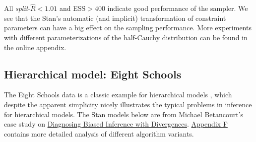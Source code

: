 \documentclass[american,]{article}
\begin{document}


All \emph{split}-\(\widehat{R}<1.01\) and ESS\(>400\) indicate good
performance of the sampler. We see that the Stan's automatic (and
implicit) transformation of constraint parameters can have a big effect
on the sampling performance. More experiments with different
parameterizations of the half-Cauchy distribution can be found in
the online appendix.

\hypertarget{eightschools}{%
\subsection{Hierarchical model: Eight Schools}\label{eightschools}}

The Eight Schools data is a classic example for hierarchical models
\citep[see Section 5.5 in][]{BDA3}, which despite the apparent
simplicity nicely illustrates the typical problems in inference for
hierarchical models. The Stan models below are from Michael Betancourt's
case study on
\href{http://mc-stan.org/users/documentation/case-studies/divergences_and_bias.html}{Diagnosing
Biased Inference with Divergences}.
\protect\hyperlink{AppendixF}{Appendix F} contains more detailed
analysis of different algorithm variants.
\end{document}
